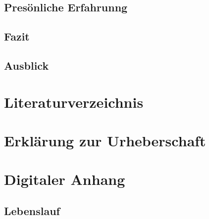 \documentclass[a4paper,12pt]{article}
\begin{document}
\subsection{Presönliche Erfahrunng}

\subsection{Fazit}

\subsection{Ausblick}


\newpage
%
\section{Literaturverzeichnis}


\newpage
\section{Erklärung zur Urheberschaft}


\newpage
\listoffigures


\listoftables %
\newpage
\section{Digitaler Anhang}

\subsection*{Lebenslauf}

\end{document}
